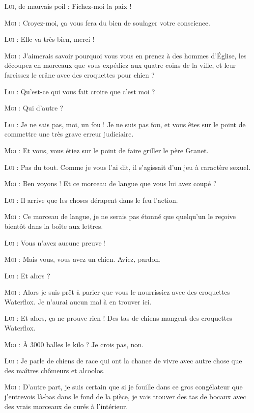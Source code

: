\textsc{Lui}, de mauvais poil : Fichez-moi la paix !

\textsc{Moi} : Croyez-moi, ça vous fera du bien de soulager votre conscience.

\textsc{Lui} : Elle va très bien, merci !

\textsc{Moi} : J’aimerais savoir pourquoi vous vous en prenez à des hommes d’Église, les découpez en morceaux que vous expédiez aux quatre coins de la ville, et leur farcissez le crâne avec des croquettes pour chien ?

\textsc{Lui} : Qu’est-ce qui vous fait croire que c’est moi ?

\textsc{Moi} : Qui d’autre ?

\textsc{Lui} : Je ne sais pas, moi, un fou ! Je ne suis pas fou, et vous êtes sur le point de commettre une très grave erreur judiciaire.

\textsc{Moi} : Et vous, vous étiez sur le point de faire griller le père Granet.

\textsc{Lui} : Pas du tout. Comme je vous l’ai dit, il s’agissait d’un jeu à caractère sexuel.

\textsc{Moi} : Ben voyons ! Et ce morceau de langue que vous lui avez coupé ?

\textsc{Lui} : Il arrive que les choses dérapent dans le feu l’action.

\textsc{Moi} : Ce morceau de langue, je ne serais pas étonné que quelqu’un le reçoive bientôt dans la boîte aux lettres.

\textsc{Lui} : Vous n’avez aucune preuve !

\textsc{Moi} : Mais vous, vous avez un chien. Aviez, pardon.

\textsc{Lui} : Et alors ?

\textsc{Moi} : Alors je suis prêt à parier que vous le nourrissiez avec des croquettes Waterflox. Je n’aurai aucun mal à en trouver ici.

\textsc{Lui} : Et alors, ça ne prouve rien ! Des tas de chiens mangent des croquettes Waterflox.

\textsc{Moi} : À 3000 balles le kilo ? Je crois pas, non.

\textsc{Lui} : Je parle de chiens de race qui ont la chance de vivre avec autre chose que des maîtres chômeurs et alcoolos.

\textsc{Moi} : D’autre part, je suis certain que si je fouille dans ce gros congélateur que j’entrevois là-bas dans le fond de la pièce, je vais trouver des tas de bocaux avec des vrais morceaux de curés à l’intérieur.


